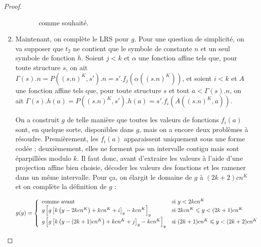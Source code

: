 \documentclass{article}
\begin{document}
\begin{proof}
\begin{enumerate}[itemsep=-1mm,leftmargin=2cm]
\begin{itemize}[itemsep=-1mm, leftmargin=1cm]
\begin{itemize}[itemsep=-1mm,leftmargin=1cm]
									comme souhaité.
							\end{itemize}
					\end{itemize}
					
					
				\item	
					Maintenant, on complète le LRS pour $g$. Pour une question de simplicité, on va supposer que $t_2$ ne contient que le symbole de constante $n$ et un seul symbole de fonction $h$. Soient $j <k$ et $\alpha$ une fonction affine tels que, pour toute structure $s$, on ait $\Gamma(s).n = P\left((s.n)^K, s'\right).n = s'.f_j\left(\alpha\left( (s.n)^K \right)\right)$, et soient $i <k$ et $A$ une fonction affine tels que, pour toute structure $s$ et tout $a < \Gamma(s).n$, on ait $\Gamma(s).h(a) = P\left((s.n)^K, s'\right).h(a) = s'.f_i\left(A\left( (s.n)^K, a \right)\right)$\footnotemark.
					
					
					On a construit $g$ de telle manière que toutes les valeurs de fonctions $f_i(a)$ sont, en quelque sorte, disponibles dans $g$, mais on a encore deux problèmes à résoudre. Premièrement, les $f_i(a)$ apparaissent uniquement sous une forme codée ; deuxièmement, elles ne forment pas un intervalle contigu mais sont éparpillées modulo $k$. Il faut donc, avant d'extraire les valeurs à l'aide d'une projection affine bien choisie, décoder les valeurs des fonctions et les ramener dans un même intervalle. Pour ça, on élargit le domaine de $g$ à $(2k+2)cn^K$ et on complète la définition de $g$ :
					
					\[
						g(y) = \left\lbrace \begin{array}{ll} 
							\text{comme avant} & \text{si $y < 2kcn^K$} \\
							g\left[ g\left[ k\left( y - 2kcn^K \right) + kcn^K  + i\right]_y - kcn^K  \right]_y & \text{si $2kcn^K \leqslant y < (2k+1)cn^K$} \\
							g\left[ g\left[ k\left( y - (2k + 1)cn^K \right) + kcn^K  + j \right]_y - kcn^K  \right]_y & \text{si $(2k+1)cn^K \leqslant y < (2k+2)cn^K$} \\
							 \end{array} \right.
					\]
					

\end{enumerate}
\end{proof}
\end{document}
